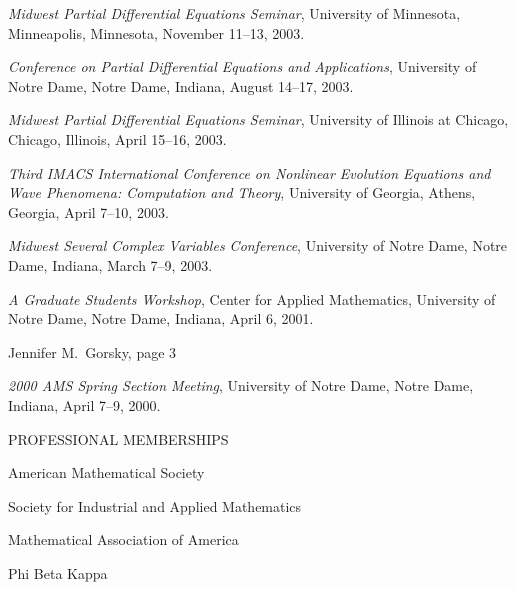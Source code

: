 \documentclass[11pt]{article}
\begin{document}
\vspace{0.1in}
\parbox[t]{0.5in}{\hspace{1in}}
\parbox[t]{6.5in}
     {

 {\em Midwest Partial Differential Equations Seminar}, University of
Minnesota, Minneapolis, Minnesota, November 11--13, 2003.
   \vspace{0.1in}


{\em Conference on Partial Differential Equations and Applications},
University of Notre Dame, Notre Dame, Indiana, August 14--17, 2003.
   \vspace{0.1in}


 {\em Midwest Partial Differential Equations Seminar}, University of
Illinois at Chicago, Chicago, Illinois, April 15--16, 2003.
   \vspace{0.1in}


 {\em Third IMACS International Conference on Nonlinear Evolution
Equations and Wave Phenomena:  Computation and Theory}, University of
Georgia, Athens, Georgia, April 7--10, 2003.
   \vspace{0.1in}

{\em Midwest Several Complex Variables Conference},
University of Notre Dame, Notre Dame, Indiana, March 7--9, 2003.
   \vspace{0.1in}

 {\em A Graduate Students Workshop}, Center for Applied
Mathematics, University of Notre Dame, Notre Dame, Indiana, April 6, 2001.
   \vspace{0.1in}


 }



 \pagebreak

{\bld Jennifer M.\ Gorsky, page 3}


\vspace{0.3in}

\parbox[t]{0.5in}{\hspace{1in}}
\parbox[t]{6.5in}
     {

{\em 2000 AMS Spring Section Meeting}, University of Notre Dame, Notre
Dame, Indiana, April 7--9, 2000.
}



\vspace{0.3in}
{\bld PROFESSIONAL MEMBERSHIPS}

\vspace{0.1in}
\parbox[t]{0.5in}{\hspace{1in}}
\parbox[t]{6.5in}
     { American Mathematical Society

\vspace{0.05in}
     Society for Industrial and Applied Mathematics

					\vspace{0.05in}
       Mathematical Association of America

       \vspace{0.05in}
       Phi Beta Kappa

     }
\end{document}
